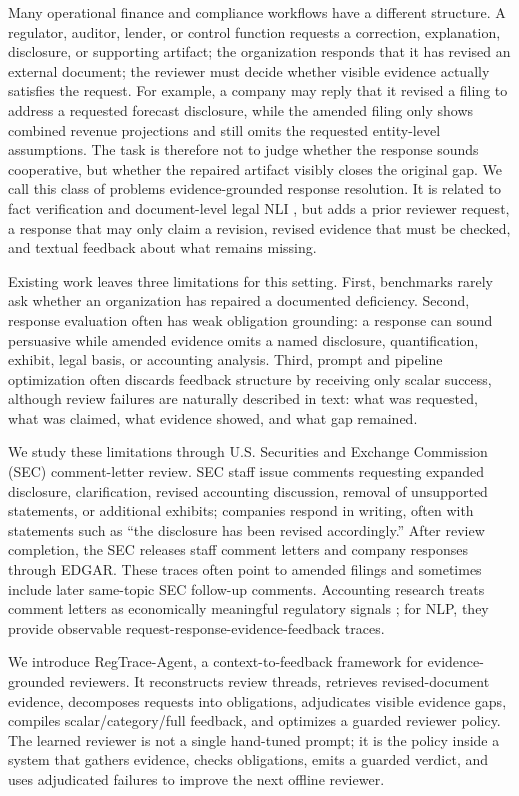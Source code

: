 \documentclass[11pt]{article}
\newcommand{\task}{evidence-grounded response resolution}
\newcommand{\framework}{RegTrace-Agent}
\begin{document}
Many operational finance and compliance workflows have a different structure. A regulator, auditor, lender, or control function requests a correction, explanation, disclosure, or supporting artifact; the organization responds that it has revised an external document; the reviewer must decide whether visible evidence actually satisfies the request. For example, a company may reply that it revised a filing to address a requested forecast disclosure, while the amended filing only shows combined revenue projections and still omits the requested entity-level assumptions. The task is therefore not to judge whether the response sounds cooperative, but whether the repaired artifact visibly closes the original gap. We call this class of problems \task{}. It is related to fact verification and document-level legal NLI \citep{thorne2018fever,koreeda2021contractnli}, but adds a prior reviewer request, a response that may only claim a revision, revised evidence that must be checked, and textual feedback about what remains missing.

Existing work leaves three limitations for this setting. First, benchmarks rarely ask whether an organization has repaired a documented deficiency. Second, response evaluation often has weak obligation grounding: a response can sound persuasive while amended evidence omits a named disclosure, quantification, exhibit, legal basis, or accounting analysis. Third, prompt and pipeline optimization often discards feedback structure by receiving only scalar success, although review failures are naturally described in text: what was requested, what was claimed, what evidence showed, and what gap remained.

We study these limitations through U.S. Securities and Exchange Commission (SEC) comment-letter review. SEC staff issue comments requesting expanded disclosure, clarification, revised accounting discussion, removal of unsupported statements, or additional exhibits; companies respond in writing, often with statements such as ``the disclosure has been revised accordingly.'' After review completion, the SEC releases staff comment letters and company responses through EDGAR. These traces often point to amended filings and sometimes include later same-topic SEC follow-up comments. Accounting research treats comment letters as economically meaningful regulatory signals \citep{cassell2013sec,bozanic2017sec,baugh2023auditor,ryans2021comment}; for NLP, they provide observable request-response-evidence-feedback traces.

We introduce \framework{}, a context-to-feedback framework for evidence-grounded reviewers. It reconstructs review threads, retrieves revised-document evidence, decomposes requests into obligations, adjudicates visible evidence gaps, compiles scalar/category/full feedback, and optimizes a guarded reviewer policy. The learned reviewer is not a single hand-tuned prompt; it is the policy inside a system that gathers evidence, checks obligations, emits a guarded verdict, and uses adjudicated failures to improve the next offline reviewer.
\end{document}
